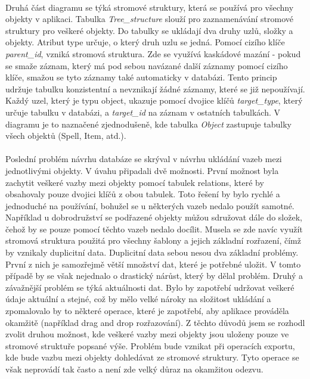 \documentclass[thesis=B,czech]{resources/FITthesis}[2012/06/26]
\begin{document}
\\
Druhá část diagramu se týká stromové struktury, která se používá pro všechny objekty v aplikaci. Tabulka \textit{Tree\_structure} slouží pro zaznamenávání stromové struktury pro veškeré objekty. Do tabulky se ukládají dva druhy uzlů, složky a objekty. Atribut type určuje, o který druh uzlu se jedná. Pomocí cizího klíče \textit{parent\_id}, vzniká stromová struktura. Zde se využívá kaskádové mazání - pokud se smaže záznam, který má pod sebou navázané další záznamy pomocí cizího klíče, smažou se tyto záznamy také automaticky v databázi. Tento princip udržuje tabulku konzistentní a nevznikají žádné záznamy, které se již nepoužívají. Každý uzel, který je typu object, ukazuje pomocí dvojice klíčů \textit{target\_type}, který určuje tabulku v databázi, a \textit{target\_id} na záznam v ostatních tabulkách. V diagramu je to naznačené zjednodušeně, kde tabulka \textit{Object} zastupuje tabulky všech objektů (Spell, Item, atd.). \\
\\
Poslední problém návrhu databáze se skrýval v návrhu ukládání vazeb mezi jednotlivými objekty. V úvahu připadali dvě možnosti. První možnost byla zachytit veškeré vazby mezi objekty pomocí tabulek relations, které by obsahovaly pouze dvojici klíčů z obou tabulek. Toto řešení by bylo rychlé a jednoduché na používání, bohužel se u některých vazeb nedalo použít samotné. Například u dobrodružství se podřazené objekty můžou sdružovat dále do složek, čehož by se pouze pomocí těchto vazeb nedalo docílit. Musela se zde navíc využít stromová struktura použitá pro všechny šablony a jejich základní rozřazení, čímž by vznikaly duplicitní data. Duplicitní data sebou nesou dva základní problémy. První z nich je samozřejmě větší množství dat, které je potřebné uložit. V tomto případě by se však nejednalo o drastický nárůst, který by dělal problém. Druhý a závažnější problém se týká aktuálnosti dat. Bylo by zapotřebí udržovat veškeré údaje aktuální a stejné, což by mělo velké nároky na složitost ukládání a zpomalovalo by to některé operace, které je zapotřebí, aby aplikace prováděla okamžitě (například drag and drop rozřazování). Z těchto důvodů jsem se rozhodl zvolit druhou možnost, kde veškeré vazby mezi objekty jsou uloženy pouze ve stromové struktuře popsané výše. Problém bude vznikat při operacích exportu, kde bude vazbu mezi objekty dohledávat ze stromové struktury. Tyto operace se však neprovádí tak často a není zde velký důraz na okamžitou odezvu. 
\end{document}
